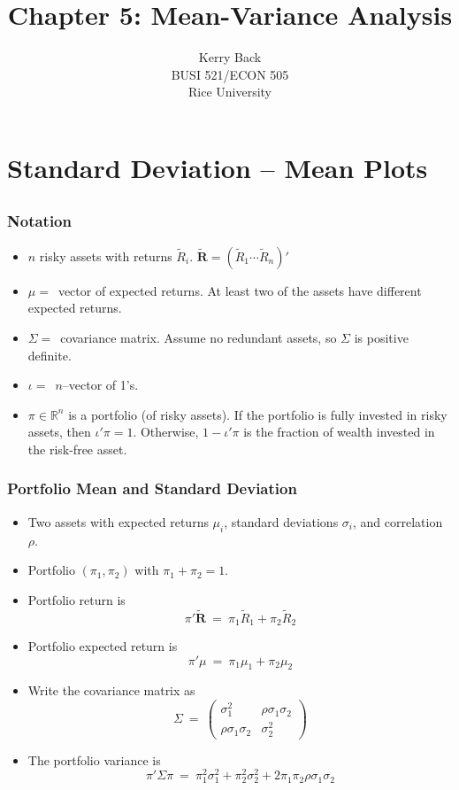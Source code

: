 \documentclass[10pt]{beamer}
\title{Chapter 5: Mean-Variance Analysis}
\date{}
\author{Kerry Back\\ 
BUSI 521/ECON 505\\
Rice University}
\newcommand{\bi}{\begin{itemize}}
\newcommand{\ei}{\end{itemize}}
\newcommand{\im}{\item}
\newcommand{\myreal}{\ensuremath{\mathbb{R}}}
\newcommand{\bfr}{\begin{frame}}
\newcommand{\tr}{\widetilde{R}}
\newcommand{\tR}{\widetilde{\mathbf{R}}}
\begin{document}
\maketitle
  
  
  \section{Standard Deviation -- Mean Plots}\subsection{}
  
  \bfr\frametitle{Notation}
  \bi
  \im $n$ risky assets with returns $\tr_i$.  $\tR = (\tr_1 \cdots \tr_n)'$
  \im $\mu=\,$ vector of expected returns.  At least two of the assets have different expected returns.
  \im  $\Sigma =\,$ covariance matrix. Assume no redundant assets, so $\Sigma$ is positive definite.
  \im $\iota=\,$ $n$--vector of 1's.
  \im $\pi \in \myreal^n$ is a portfolio (of risky assets).  If the portfolio is fully invested in risky assets, then $\iota'\pi=1$.  Otherwise, $1-\iota'\pi$ is the fraction of wealth invested in the risk-free asset.
  \ei
  \end{frame}
  
  
  \bfr\frametitle{Portfolio Mean and Standard Deviation}
  \bi
  \im Two assets with expected returns $\mu_i$, standard deviations $\sigma_i$, and correlation $\rho$. 
  \im Portfolio $(\pi_1, \pi_2)$ with $\pi_1+\pi_2=1$.
  \im Portfolio return is 
  $$\pi' \tR \ = \ \pi_1\tilde{R}_1 + \pi_2\tilde{R}_2 $$
   \im Portfolio expected return is 
  $$\pi'\mu \ = \ \pi_1\mu_1 + \pi_2\mu_2 $$
  \im Write the covariance matrix as
  $$\Sigma \ = \ \begin{pmatrix} \sigma_1^2 & \rho\sigma_1\sigma_2 \\ \rho\sigma_1\sigma_2 & \sigma_2^2
  \end{pmatrix}$$
   \im The portfolio variance is
  $$\pi'\Sigma\pi \ = \ \pi_1^2\sigma_1^2 + \pi_2^2\sigma_2^2 + 2\pi_1\pi_2\rho\sigma_1\sigma_2$$
  \ei
\end{frame}
  
\end{document}
